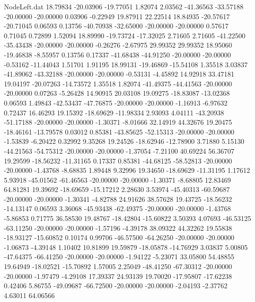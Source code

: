 \begin{filecontents}{NodeLeft.dat}
  18.79834  -20.03906  -19.77051     1.82074    2.03562  -41.36563  -33.57188  -20.00000  -20.00000    0.03906   -0.22949   19.87911   22.22514
  18.84935  -20.57617  -20.71045     0.06593    0.13756  -40.70938  -32.65000  -20.00000  -20.00000    0.57617    0.71045    0.72899    1.52094
  18.89990  -19.73724  -17.32025     2.71605    2.71605  -41.22500  -35.43438  -20.00000  -20.00000   -0.26276   -2.67975   29.99352   29.99352
  18.95060  -19.46838   -8.55957     0.13756    0.17337  -41.68438  -44.91250  -20.00000  -20.00000   -0.53162  -11.44043    1.51701    1.91195
  18.99131  -19.46869  -15.54108     1.35518    3.03837  -41.89062  -43.32188  -20.00000  -20.00000   -0.53131   -4.45892   14.92918   33.47181
  19.04197  -20.07263  -14.73572     1.35518    1.82074  -41.49375  -44.41563  -20.00000  -20.00000    0.07263   -5.26428   14.90915   20.03108
  19.09275  -18.83087  -13.02368     0.06593    1.49843  -42.53437  -47.76875  -20.00000  -20.00000   -1.16913   -6.97632    0.72437   16.46293
  19.15392  -18.69629  -11.98334     2.93093    4.04111  -43.20938  -51.17188  -20.00000  -20.00000   -1.30371   -8.01666   32.14919   44.32676
  19.20475  -18.46161  -13.79578     0.03012    0.85381  -43.85625  -52.15313  -20.00000  -20.00000   -1.53839   -6.20422    0.32992    9.35268
  19.24526  -18.62946  -12.78900     3.71880    5.15130  -44.21563  -54.75312  -20.00000  -20.00000   -1.37054   -7.21100   40.69224   56.36707
  19.29599  -18.56232  -11.31165     0.17337    0.85381  -44.68125  -58.52813  -20.00000  -20.00000   -1.43768   -8.68835    1.89448    9.32996
  19.34650  -18.69629  -11.31195     1.17612    5.93918  -45.01562  -61.46563  -20.00000  -20.00000   -1.30371   -8.68805   12.83469   64.81281
  19.39692  -18.69659  -15.17212     2.28630    3.53974  -45.40313  -60.59687  -20.00000  -20.00000   -1.30341   -4.82788   24.91626   38.57628
  19.43725  -18.56232  -14.13147     0.06593    3.36068  -45.93438  -62.49375  -20.00000  -20.00000   -1.43768   -5.86853    0.71775   36.58530
  19.48767  -18.42804  -15.60822     3.50393    4.07693  -46.53125  -63.11250  -20.00000  -20.00000   -1.57196   -4.39178   38.09322   44.32262
  19.55838  -18.93127  -15.60852     0.10174    0.99706  -46.57500  -64.26250  -20.00000  -20.00000   -1.06873   -4.39148    1.10402   10.81899
  19.59879  -18.05878  -14.76929     3.03837    5.00805  -47.64375  -66.41250  -20.00000  -20.00000   -1.94122   -5.23071   33.05800   54.48855
  19.64949  -18.02521  -15.70892     1.57005    2.25049  -48.41250  -67.30312  -20.00000  -20.00000   -1.97479   -4.29108   17.39337   24.93139
  19.70020  -17.95807  -17.62238     0.42406    5.86755  -49.09687  -66.72500  -20.00000  -20.00000   -2.04193   -2.37762    4.63011   64.06566

\end{filecontents}
